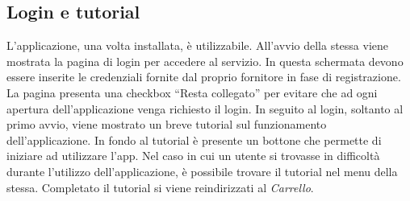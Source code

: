 \documentclass[12pt, a4paper, titlepage]{report}
\begin{document}
	\subsection{Login e tutorial}
	
	L'applicazione, una volta installata, è utilizzabile. All'avvio della stessa viene mostrata la pagina di login per accedere al servizio. In questa schermata devono essere inserite le credenziali fornite dal proprio fornitore in fase di registrazione. La pagina presenta una checkbox ``Resta collegato'' per evitare che ad ogni apertura dell'applicazione venga richiesto il login. In seguito al login, soltanto al primo avvio, viene mostrato un breve tutorial sul funzionamento dell'applicazione. In fondo al tutorial è presente un bottone che permette di iniziare ad utilizzare l'app. Nel caso in cui un utente si trovasse in difficoltà durante l'utilizzo dell'applicazione, è possibile trovare il tutorial nel menu della stessa. Completato il tutorial si viene reindirizzati al \textit{Carrello}.
	
\end{document}
